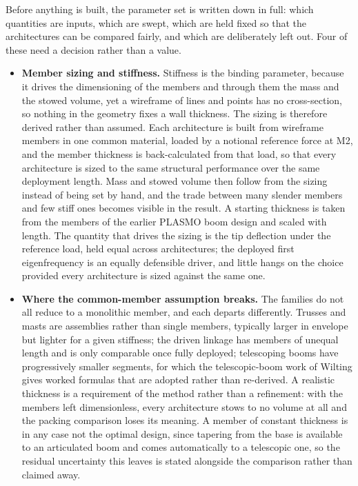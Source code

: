  Before anything is built, the parameter set is written down in full: which quantities are inputs, which are swept, which are held fixed so that the architectures can be compared fairly, and which are deliberately left out. Four of these need a decision rather than a value.

\begin{itemize}
    \item \textbf{Member sizing and stiffness.} Stiffness is the binding parameter, because it drives the dimensioning of the members and through them the mass and the stowed volume, yet a wireframe of lines and points has no cross-section, so nothing in the geometry fixes a wall thickness. The sizing is therefore derived rather than assumed. Each architecture is built from wireframe members in one common material, loaded by a notional reference force at M2, and the member thickness is back-calculated from that load, so that every architecture is sized to the same structural performance over the same deployment length. Mass and stowed volume then follow from the sizing instead of being set by hand, and the trade between many slender members and few stiff ones becomes visible in the result. A starting thickness is taken from the members of the earlier PLASMO boom design and scaled with length. The quantity that drives the sizing is the tip deflection under the reference load, held equal across architectures; the deployed first eigenfrequency is an equally defensible driver, and little hangs on the choice provided every architecture is sized against the same one.

    \item \textbf{Where the common-member assumption breaks.} The families do not all reduce to a monolithic member, and each departs differently. Trusses and masts are assemblies rather than single members, typically larger in envelope but lighter for a given stiffness; the driven linkage has members of unequal length and is only comparable once fully deployed; telescoping booms have progressively smaller segments, for which the telescopic-boom work of Wilting gives worked formulas that are adopted rather than re-derived. A realistic thickness is a requirement of the method rather than a refinement: with the members left dimensionless, every architecture stows to no volume at all and the packing comparison loses its meaning. A member of constant thickness is in any case not the optimal design, since tapering from the base is available to an articulated boom and comes automatically to a telescopic one, so the residual uncertainty this leaves is stated alongside the comparison rather than claimed away.


\end{itemize}
